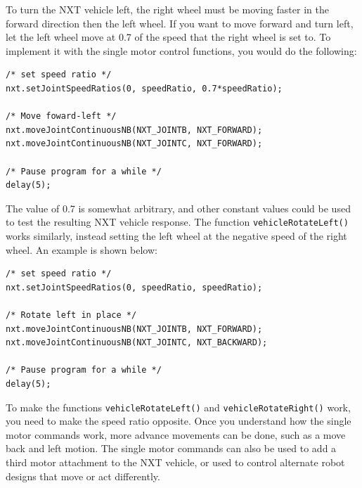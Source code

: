 \documentclass[11pt]{article}
\begin{document}
To turn the NXT vehicle left, the right wheel must be moving faster in the forward 
direction then the left wheel. If you want to move forward and turn left, let 
the left wheel move at 0.7 of the speed that the right wheel is set to. To 
implement it with the single motor control functions, you would do the following:
\begin{lstlisting}
/* set speed ratio */
nxt.setJointSpeedRatios(0, speedRatio, 0.7*speedRatio);

/* Move foward-left */
nxt.moveJointContinuousNB(NXT_JOINTB, NXT_FORWARD);
nxt.moveJointContinuousNB(NXT_JOINTC, NXT_FORWARD);

/* Pause program for a while */
delay(5);
\end{lstlisting}
The value of 0.7 is somewhat arbitrary, and other constant values could be used 
to test the resulting NXT vehicle response. The function {\tt vehicleRotateLeft()} 
works similarly, instead setting the left wheel at the negative speed of the right 
wheel. An example is shown below:
\begin{lstlisting}
/* set speed ratio */
nxt.setJointSpeedRatios(0, speedRatio, speedRatio);

/* Rotate left in place */
nxt.moveJointContinuousNB(NXT_JOINTB, NXT_FORWARD);
nxt.moveJointContinuousNB(NXT_JOINTC, NXT_BACKWARD);

/* Pause program for a while */
delay(5);
\end{lstlisting}
To make the functions {\tt vehicleRotateLeft()} and {\tt vehicleRotateRight()} work, 
you need to make the speed ratio opposite. Once you understand how the single motor 
commands work, more advance movements can be done, such as a move back and left motion. 
The single motor commands can also be used to add a third motor attachment to the NXT 
vehicle, or used to control alternate robot designs that move or act differently.\\
\end{document}

